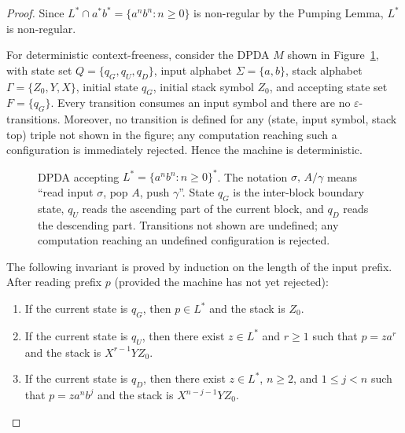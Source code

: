\documentclass[11pt,a4paper]{article}
\begin{document}
\begin{proof}
Since $L^*\cap a^*b^*=\{a^nb^n:n\ge 0\}$ is non-regular by the Pumping
Lemma, $L^*$ is non-regular.

For deterministic context-freeness, consider the DPDA $M$ shown in
Figure~\ref{fig:lstar-dpda}, with state set $Q=\{q_G,q_U,q_D\}$,
input alphabet $\Sigma=\{a,b\}$, stack alphabet $\Gamma=\{Z_0,Y,X\}$,
initial state $q_G$, initial stack symbol $Z_0$, and accepting state set
$F=\{q_G\}$.
Every transition consumes an input symbol and there are no
$\varepsilon$-transitions.
Moreover, no transition is defined for any (state, input symbol, stack
top) triple not shown in the figure; any computation reaching such a
configuration is immediately rejected.
Hence the machine is deterministic.

\begin{figure}[H]
\centering
{}
\caption{DPDA accepting $L^*=\{a^nb^n:n\ge 0\}^*$.
The notation $\sigma,\,A/\gamma$ means ``read input $\sigma$, pop $A$,
push $\gamma$''.
State $q_G$ is the inter-block boundary state, $q_U$ reads the ascending
part of the current block, and $q_D$ reads the descending part.
Transitions not shown are undefined; any computation reaching an
undefined configuration is rejected.}
\label{fig:lstar-dpda}
\end{figure}

The following invariant is proved by induction on the length of the
input prefix.
After reading prefix $p$ (provided the machine has not yet rejected):
\begin{enumerate}[label=\textup{(\roman*)},nosep]
\item If the current state is $q_G$, then $p\in L^*$ and the stack is
      $Z_0$.
\item If the current state is $q_U$, then there exist $z\in L^*$ and
      $r\ge 1$ such that $p=za^r$ and the stack is $X^{r-1}YZ_0$.
\item If the current state is $q_D$, then there exist $z\in L^*$,
      $n\ge 2$, and $1\le j<n$ such that $p=za^nb^j$ and the stack is
      $X^{n-j-1}YZ_0$.
\end{enumerate}


\end{proof}
\end{document}
